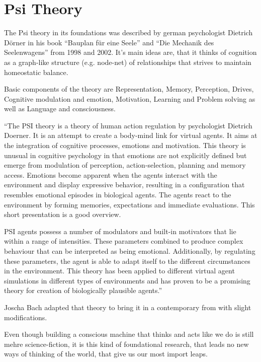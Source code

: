 \section{Psi Theory}
The Psi theory in its foundations was described by german psychologist Dietrich Dörner in his book ``Bauplan für eine Seele'' and ``Die Mechanik des Seelenwagens'' from 1998 and 2002. It's main ideas are, that it thinks of cognition as a graph-like structure (e.g. node-net) of relationships that strives to maintain homeostatic balance.\cite{Bach:2009:PSI:1611304}

Basic components of the theory are Representation, Memory, Perception, Drives, Cognitive modulation and emotion, Motivation, Learning and Problem solving as well as Language and consciousness. %

``The PSI theory is a theory of human action regulation by psychologist Dietrich Doerner. It is an attempt to create a body-mind link for virtual agents. It aims at the integration of cognitive processes, emotions and motivation. This theory is unusual in cognitive psychology in that emotions are not explicitly defined but emerge from modulation of perception, action-selection, planning and memory access. Emotions become apparent when the agents interact with the environment and display expressive behavior, resulting in a configuration that resembles emotional episodes in biological agents. The agents react to the environment by forming memories, expectations and immediate evaluations. This short presentation is a good overview.

PSI agents possess a number of modulators and built-in motivators that lie within a range of intensities. These parameters combined to produce complex behaviour that can be interpreted as being emotional. Additionally, by regulating these parameters, the agent is able to adapt itself to the different circumstances in the environment. This theory has been applied to different virtual agent simulations in different types of environments and has proven to be a promising theory for creation of biologically plausible agents.'' %



Joscha Bach adapted that theory to bring it in a contemporary from with slight modifications.


Even though building a conscious machine that thinks and acts like we do is still mehre science-fiction, it is this kind of foundational research, that leads no new ways of thinking of the world, that give us our most import leaps.

